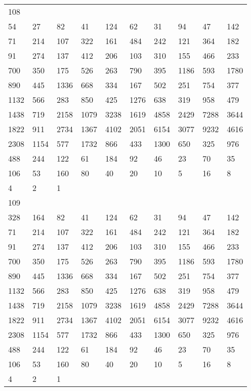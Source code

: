 \begin{longtable}{*{10}{l}}
108&&&&&&&&&\\
54& 27& 82& 41& 124& 62& 31& 94& 47& 142\\
71& 214& 107& 322& 161& 484& 242& 121& 364& 182\\
91& 274& 137& 412& 206& 103& 310& 155& 466& 233\\
700& 350& 175& 526& 263& 790& 395& 1186& 593& 1780\\
890& 445& 1336& 668& 334& 167& 502& 251& 754& 377\\
1132& 566& 283& 850& 425& 1276& 638& 319& 958& 479\\
1438& 719& 2158& 1079& 3238& 1619& 4858& 2429& 7288& 3644\\
1822& 911& 2734& 1367& 4102& 2051& 6154& 3077& 9232& 4616\\
2308& 1154& 577& 1732& 866& 433& 1300& 650& 325& 976\\
488& 244& 122& 61& 184& 92& 46& 23& 70& 35\\
106& 53& 160& 80& 40& 20& 10& 5& 16& 8\\
4& 2& 1& \\

109&&&&&&&&&\\
328& 164& 82& 41& 124& 62& 31& 94& 47& 142\\
71& 214& 107& 322& 161& 484& 242& 121& 364& 182\\
91& 274& 137& 412& 206& 103& 310& 155& 466& 233\\
700& 350& 175& 526& 263& 790& 395& 1186& 593& 1780\\
890& 445& 1336& 668& 334& 167& 502& 251& 754& 377\\
1132& 566& 283& 850& 425& 1276& 638& 319& 958& 479\\
1438& 719& 2158& 1079& 3238& 1619& 4858& 2429& 7288& 3644\\
1822& 911& 2734& 1367& 4102& 2051& 6154& 3077& 9232& 4616\\
2308& 1154& 577& 1732& 866& 433& 1300& 650& 325& 976\\
488& 244& 122& 61& 184& 92& 46& 23& 70& 35\\
106& 53& 160& 80& 40& 20& 10& 5& 16& 8\\
4& 2& 1& \\


\end{longtable}
